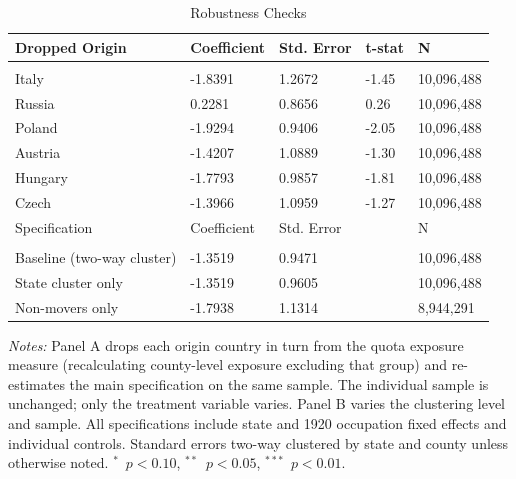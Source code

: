 \begin{table}[htbp]
\centering
\caption{Robustness Checks}
\label{tab:robustness}
\small
\begin{threeparttable}
\begin{tabular}[t]{lllll}
\toprule
Dropped Origin & Coefficient & Std. Error & t-stat & N\\
\midrule
\addlinespace[0.3em]
\multicolumn{5}{l}{\textbf{Panel A: Leave-One-Origin-Out}}\\
\hspace{1em}Italy & -1.8391 & 1.2672 & -1.45 & 10,096,488\\
\hspace{1em}Russia & 0.2281 & 0.8656 & 0.26 & 10,096,488\\
\hspace{1em}Poland & -1.9294 & 0.9406 & -2.05 & 10,096,488\\
\hspace{1em}Austria & -1.4207 & 1.0889 & -1.30 & 10,096,488\\
\hspace{1em}Hungary & -1.7793 & 0.9857 & -1.81 & 10,096,488\\
\hspace{1em}Czech & -1.3966 & 1.0959 & -1.27 & 10,096,488\\
\addlinespace[0.5em]
\midrule
Specification & Coefficient & Std. Error & & N\\
\midrule
\addlinespace[0.3em]
\multicolumn{5}{l}{\textbf{Panel B: Alternative Specifications}}\\
\hspace{1em}Baseline (two-way cluster) & -1.3519 & 0.9471 & & 10,096,488\\
\hspace{1em}State cluster only & -1.3519 & 0.9605 & & 10,096,488\\
\hspace{1em}Non-movers only & -1.7938 & 1.1314 & & 8,944,291\\
\bottomrule
\end{tabular}
\begin{tablenotes}[flushleft]\footnotesize
\item \textit{Notes:} Panel A drops each origin country in turn from the quota exposure
measure (recalculating county-level exposure excluding that group) and re-estimates the
main specification on the same sample. The individual sample is unchanged; only the
treatment variable varies. Panel B varies the clustering level and sample.
All specifications include state and 1920 occupation fixed effects and individual
controls. Standard errors two-way clustered by state and county unless otherwise noted.
$^{*}$~$p<0.10$, $^{**}$~$p<0.05$, $^{***}$~$p<0.01$.
\end{tablenotes}
\end{threeparttable}
\end{table}
